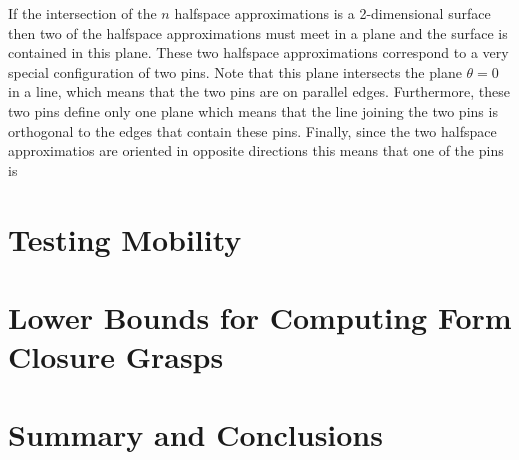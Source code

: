 \documentclass[lotsofwhite,charterfonts]{patmorin}
\begin{document}
If the intersection of the $n$ halfspace approximations is a 2-dimensional
surface then two of the halfspace approximations must meet in a plane and the
surface is contained in this plane.  These two halfspace approximations
correspond to a very special configuration of two pins.   Note that this plane
intersects the plane $\theta=0$ in a line, which means that the two pins are on
parallel edges.  Furthermore, these two pins define only one plane which means
that the line joining the two pins is orthogonal to the edges that contain
these pins.  Finally, since the two halfspace approximatios are oriented in
opposite directions this means that one of the pins is 




\section{Testing Mobility}

\section{Lower Bounds for Computing Form Closure Grasps}

\section{Summary and Conclusions}
\end{document}
